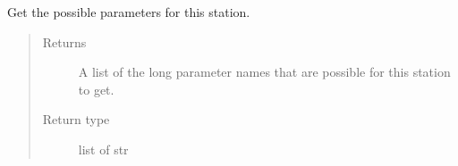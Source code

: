 \documentclass[letterpaper,10pt,english]{sphinxmanual}
\begin{document}
\begin{fulllineitems}

\begin{fulllineitems}
\label{\detokenize{weatherDB:weatherDB.station.GroupStation.get_possible_paras}}
\sphinxAtStartPar
Get the possible parameters for this station.
\begin{quote}\begin{description}
\item[{Returns}] \leavevmode
\sphinxAtStartPar
A list of the long parameter names that are possible for this station to get.

\item[{Return type}] \leavevmode
\sphinxAtStartPar
list of str

\end{description}\end{quote}

\end{fulllineitems}


\end{fulllineitems}

\end{document}
